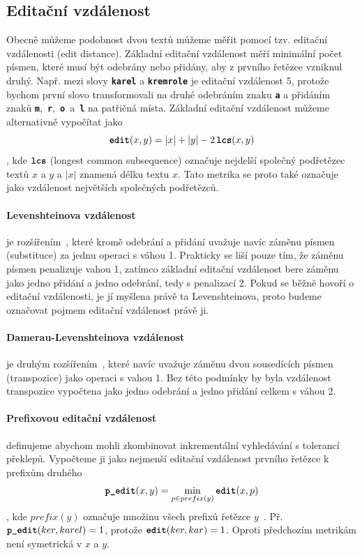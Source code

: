 \documentclass[11pt,letterpaper,oneside,openright]{book}
\newcommand{\bftt}[1]{\texttt{\textbf{#1}}}
\begin{document}
\subsection{Editační vzdálenost}
Obecně můžeme podobnost dvou textů můžeme měřit pomocí tzv. editační
vzdálenosti (edit distance). Základní editační vzdálenost měří minimální počet
písmen, které musí být odebrány nebo přidány, aby z prvního řetězce vzniknul
druhý. Např. mezi slovy \bftt{karel} a \bftt{kremrole} je editační vzdálenost
5, protože bychom první slovo transformovali na druhé odebráním znaku \bftt{a}
a přidáním znaků \bftt{m},~\bftt{r},~\bftt{o}~a~\bftt{l} na patřičná místa.
Základní editační vzdálenost můžeme alternativně vypočítat jako \[\bftt{edit}(x,
y) = |x| + |y| - 2\,\bftt{lcs}(x, y)\], kde $\bftt{lcs}$ (longest common
subsequence) označuje nejdelší společný podřetězec textů $x$ a $y$ a $|x|$
znamená délku textu $x$.  Tato metrika se proto také označuje jako vzdálenost
největších společných podřetězců.

\paragraph{Levenshteinova vzdálenost} je rozšířením~\cite{Levenshtein66}, které
kromě odebrání a přidání uvažuje navíc záměnu písmen (substituce) za jednu
operaci s váhou 1.  Prakticky se liší pouze tím, že záměnu písmen penalizuje
vahou 1, zatímco základní editační vzdálenost bere záměnu jako jedno přidání a
jedno odebrání, tedy s penalizací 2. Pokud se běžně hovoří o editační
vzdálenosti, je jí myšlena právě ta Levenshteinova, proto budeme označovat
pojmem editační vzdálenost právě ji.

\paragraph{Damerau-Levenshteinova vzdálenost} je druhým
rozšířením~\cite{Damerau:1964:TCD:363958.363994}, které navíc uvažuje záměnu
dvou sousedících písmen (transpozice) jako operaci s vahou 1.  Bez této
podmínky by byla vzdálenost transpozice vypočtena jako jedno odebrání a jedno
přidání celkem s váhou 2.

\paragraph{Prefixovou editační vzdálenost} definujeme abychom mohli zkombinovat
inkrementální vyhledávání s tolerancí překlepů. Vypočteme ji jako nejmenší
editační vzdálenost prvního řetězce k prefixům druhého \[\bftt{p\_edit}(x, y) =
\min_{p \in prefix(y)} \bftt{edit}(x, p)\], kde $prefix(y)$ označuje množinu
všech prefixů řetězce $y$~\cite{Bast:2013:EFS:2457465.2457470}. Př.
$\bftt{p\_edit}(ker, karel) = 1$, protože $\bftt{edit}(ker, kar) = 1$. Oproti
předchozím metrikám není symetrická v $x$ a $y$. 
\end{document}
